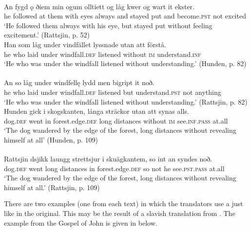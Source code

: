 \documentclass[output=paper]{langscibook}
\begin{document}
\ex {}\label{ex:kalm:23b}\\ 
\gll An fygd ǫ ðiem min ogum olltiett og låg kwer og wart it ekster.\\
he followed at them with eyes always and stayed put and become.\textsc{pst} not excited\\
\glt ‘He followed them always with his eye, but stayed put without feeling excitement.’ (Rattsjin, p. 52)
\z 
\ex
\label{ex:kalm:24}
\ea {}\label{ex:kalm:24a}\\
\gll Han som låg under vindfället lyssnade utan att förstå.\\
he who laid under windfall.\textsc{def} listened without \textsc{im} understand.\textsc{inf}\\
\glt ‘He who was under the windfall listened without understanding.’ (Hunden, p. 82)\\
\ex {}\label{ex:kalm:24b}\\ 
\gll An so låg under windfellę lydd men bigript it noð.\\
he who laid under windfall.\textsc{def} listened but understand.\textsc{pst} not anything\\
\glt ‘He who was under the windfall listened without understanding.’ (Rattsjin, p. 82)
\z
\ex
\label{ex:kalm:25}
\ea {}\label{ex:kalm:25a}\\
\gll Hunden gick i skogskanten, långa sträckor utan att synas alls.\\
dog.\textsc{def} went in forest.edge.\textsc{def} long distances without \textsc{im} see.\textsc{inf.pass} at.all\\
\glt ‘The dog wandered by the edge of the forest, long distances without revealing himself at all’ (Hunden, p. 109)\\
\ex {}\label{ex:kalm:25b}\\ 
\gll Rattsjin dsjikk laungg strettsjur i skuägkantem, so int an syndes noð.\\
dog.\textsc{def} went long distances in forest.edge.\textsc{def} so not he see.\textsc{pst.pass} at.all\\
\glt ‘The dog wandered by the edge of the forest, long distances without revealing himself at all.’ (Rattsjin, p. 109)
\z 
\z 


There are two examples (one from each text) in which the translators use a  just like in the  original. This may be the result of a slavish translation from . The example from the Gospel of John is given in  below.\pagebreak
\end{document}
